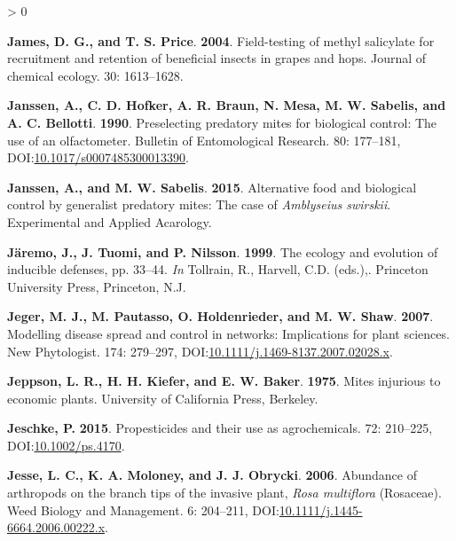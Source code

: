 \documentclass{ufdissertation}[overrideChapters] %
\newlength{\cslhangindent}
\newenvironment{CSLReferences}[2] %
 {%
  \setlength{\parindent}{0pt}
  \ifodd #1 \everypar{\setlength{\hangindent}{\cslhangindent}}\ignorespaces\fi
  \ifnum #2 > 0
  \setlength{\parskip}{#2\baselineskip}
  \fi
 }%
 {}
\begin{document}
{\begin{CSLReferences}{1}{1}
\leavevmode{}%
\textbf{James, D. G., and T. S. Price}. \textbf{2004}. Field-testing of methyl salicylate for recruitment and retention of beneficial insects in grapes and hops. Journal of chemical ecology. 30: 1613--1628.

\leavevmode{}%
\textbf{Janssen, A., C. D. Hofker, A. R. Braun, N. Mesa, M. W. Sabelis, and A. C. Bellotti}. \textbf{1990}. Preselecting predatory mites for biological control: The use of an olfactometer. Bulletin of Entomological Research. 80: 177--181, DOI:\href{https://doi.org/10.1017/s0007485300013390}{10.1017/s0007485300013390}.

\leavevmode{}%
\textbf{Janssen, A., and M. W. Sabelis}. \textbf{2015}. Alternative food and biological control by generalist predatory mites: The case of {\emph{Amblyseius swirskii}}. Experimental and Applied Acarology.

\leavevmode{}%
\textbf{Järemo, J., J. Tuomi, and P. Nilsson}. \textbf{1999}. The ecology and evolution of inducible defenses, pp. 33--44. \emph{In} Tollrain, R., Harvell, C.D. (eds.),. Princeton University Press, Princeton, N.J.

\leavevmode{}%
\textbf{Jeger, M. J., M. Pautasso, O. Holdenrieder, and M. W. Shaw}. \textbf{2007}. Modelling disease spread and control in networks: Implications for plant sciences. New Phytologist. 174: 279--297, DOI:\href{https://doi.org/10.1111/j.1469-8137.2007.02028.x}{10.1111/j.1469-8137.2007.02028.x}.

\leavevmode{}%
\textbf{Jeppson, L. R., H. H. Kiefer, and E. W. Baker}. \textbf{1975}. Mites injurious to economic plants. University of California Press, Berkeley.

\leavevmode{}%
\textbf{Jeschke, P.} \textbf{2015}. Propesticides and their use as agrochemicals. 72: 210--225, DOI:\href{https://doi.org/10.1002/ps.4170}{10.1002/ps.4170}.

\leavevmode{}%
\textbf{Jesse, L. C., K. A. Moloney, and J. J. Obrycki}. \textbf{2006}. Abundance of arthropods on the branch tips of the invasive plant, {\emph{Rosa multiflora}} ({Rosaceae}). Weed Biology and Management. 6: 204--211, DOI:\href{https://doi.org/10.1111/j.1445-6664.2006.00222.x}{10.1111/j.1445-6664.2006.00222.x}.


\end{CSLReferences}}
\end{document}
